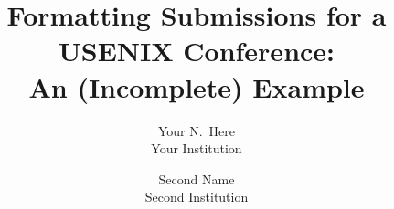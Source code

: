 \documentclass[letterpaper,twocolumn,10pt]{article}
\begin{document}


\date{}

\title{\Large \bf Formatting Submissions for a USENIX Conference:\\
  An (Incomplete) Example}

\author{
{\rm Your N.\ Here}\\
Your Institution
\and
{\rm Second Name}\\
Second Institution
} %

\maketitle











\end{document}
